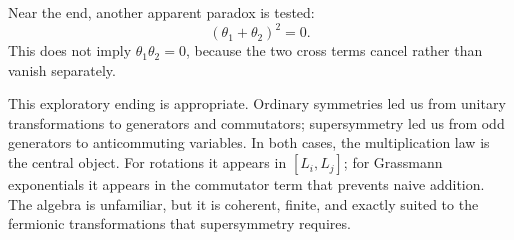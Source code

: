 Near the end, another apparent paradox is tested:
\begin{equation}
(\theta_1+\theta_2)^2=0.
\end{equation}
This does not imply \(\theta_1\theta_2=0\), because the two cross terms cancel rather than vanish separately.

\begin{classroomqa}
\end{classroomqa}

\begin{classroomqa}
\end{classroomqa}

This exploratory ending is appropriate. Ordinary symmetries led us from unitary transformations to generators and commutators; supersymmetry led us from odd generators to anticommuting variables. In both cases, the multiplication law is the central object. For rotations it appears in \([L_i,L_j]\); for Grassmann exponentials it appears in the commutator term that prevents naive addition. The algebra is unfamiliar, but it is coherent, finite, and exactly suited to the fermionic transformations that supersymmetry requires.
